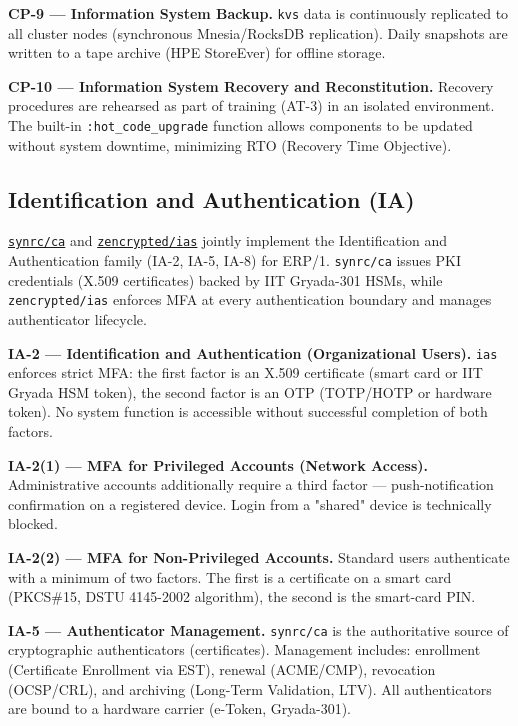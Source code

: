 \documentclass{article}
\begin{document}
\textbf{CP-9 --- Information System Backup.}
\texttt{kvs} data is continuously replicated to all cluster nodes (synchronous Mnesia/RocksDB replication). Daily snapshots are written to a tape archive (HPE StoreEver) for offline storage.

\textbf{CP-10 --- Information System Recovery and Reconstitution.}
Recovery procedures are rehearsed as part of training (AT-3) in an isolated environment. The built-in \texttt{:hot\_code\_upgrade} function allows components to be updated without system downtime, minimizing RTO (Recovery Time Objective).

\subsection{Identification and Authentication (IA)}

\href{https://github.com/synrc/ca}{\texttt{synrc/ca}} and \href{https://github.com/zencrypted/ias}{\texttt{zencrypted/ias}} jointly implement the Identification and Authentication family (IA-2, IA-5, IA-8) for ERP/1. \texttt{synrc/ca} issues PKI credentials (X.509 certificates) backed by IIT Gryada-301 HSMs, while \texttt{zencrypted/ias} enforces MFA at every authentication boundary and manages authenticator lifecycle.

\textbf{IA-2 --- Identification and Authentication (Organizational Users).}
\texttt{ias} enforces strict MFA: the first factor is an X.509 certificate (smart card or IIT Gryada HSM token), the second factor is an OTP (TOTP/HOTP or hardware token). No system function is accessible without successful completion of both factors.

\textbf{IA-2(1) --- MFA for Privileged Accounts (Network Access).}
Administrative accounts additionally require a third factor --- push-notification confirmation on a registered device. Login from a "shared" device is technically blocked.

\textbf{IA-2(2) --- MFA for Non-Privileged Accounts.}
Standard users authenticate with a minimum of two factors. The first is a certificate on a smart card (PKCS\#15, DSTU 4145-2002 algorithm), the second is the smart-card PIN.

\textbf{IA-5 --- Authenticator Management.}
\texttt{synrc/ca} is the authoritative source of cryptographic authenticators (certificates). Management includes: enrollment (Certificate Enrollment via EST), renewal (ACME/CMP), revocation (OCSP/CRL), and archiving (Long-Term Validation, LTV). All authenticators are bound to a hardware carrier (e-Token, Gryada-301).
\end{document}
